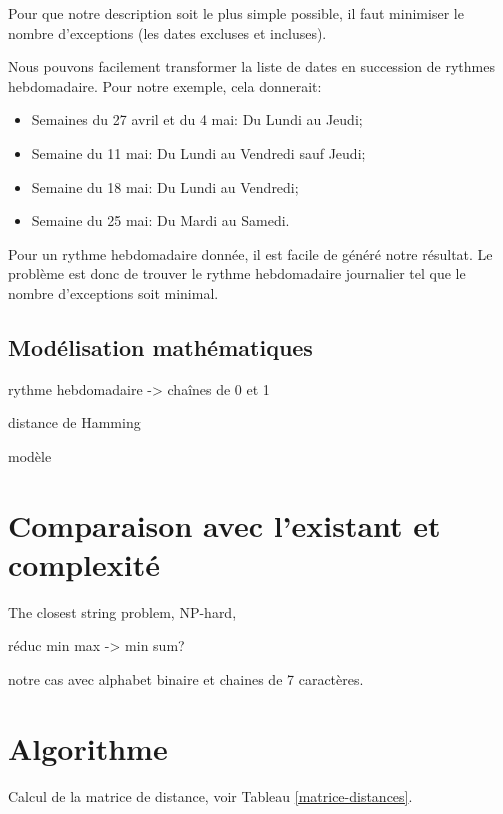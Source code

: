 \documentclass{roadef}
\begin{document}
Pour que notre description soit le plus simple possible, il faut
minimiser le nombre d'exceptions (les dates excluses et incluses).

Nous pouvons facilement transformer la liste de dates en succession de
rythmes hebdomadaire. Pour notre exemple, cela donnerait:
\begin{itemize}
\item Semaines du 27 avril et du 4 mai: Du Lundi au Jeudi;
\item Semaine du 11 mai: Du Lundi au Vendredi sauf Jeudi;
\item Semaine du 18 mai: Du Lundi au Vendredi;
\item Semaine du 25 mai: Du Mardi au Samedi.
\end{itemize}

Pour un rythme hebdomadaire donnée, il est facile de généré notre
résultat.  Le problème est donc de trouver le rythme hebdomadaire
journalier tel que le nombre d'exceptions soit minimal.

\subsection{Modélisation mathématiques}

rythme hebdomadaire -> chaînes de 0 et 1

distance de Hamming

modèle

\section{Comparaison avec l'existant et complexité}

The closest string problem, NP-hard, \cite{lanctot2003distinguishing}

réduc min max -> min sum?

notre cas avec alphabet binaire et chaines de 7 caractères.

\section{Algorithme}

Calcul de la matrice de distance, voir Tableau \ref{matrice-distances}.
\end{document}
